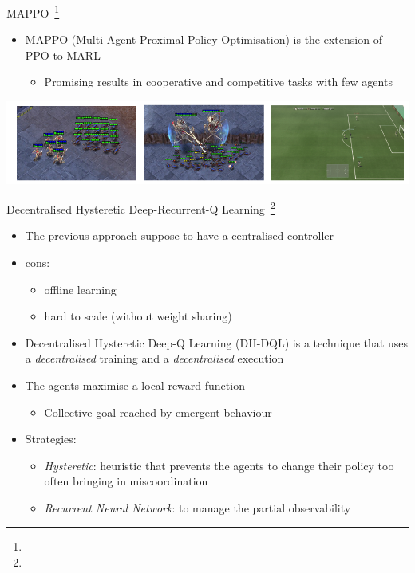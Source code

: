 \documentclass[presentation, 8pt]{beamer}\mode<presentation>{\usetheme{AMSBolognaFC}}
\begin{document}
\begin{frame}{MAPPO~\footnote[frame]{}}
	\begin{itemize}
		\item MAPPO (Multi-Agent Proximal Policy Optimisation) is the extension of PPO to MARL
		\begin{itemize}
			\item Promising results in cooperative and competitive tasks with few agents
		\end{itemize}
	\end{itemize}
	\centering
	\includegraphics[width=\textwidth]{img/mappo.png}
\end{frame}
\begin{frame}{Decentralised Hysteretic Deep-Recurrent-Q Learning~\footnote[frame]{}}
	\begin{itemize}
		\item The previous approach suppose to have a centralised controller
		\item cons:
		\begin{itemize}
			\item offline learning
			\item hard to scale (without weight sharing)
		\end{itemize}
		\item Decentralised Hysteretic Deep-Q Learning (DH-DQL) is a technique that uses a \emph{decentralised} training and a \emph{decentralised} execution
		\item The agents maximise a local reward function
		\begin{itemize}
			\item Collective goal reached by emergent behaviour
		\end{itemize}
		\item Strategies:
		\begin{itemize}
			\item \emph{Hysteretic}: heuristic that prevents the agents to change their policy too often bringing in miscoordination
			\item \emph{Recurrent Neural Network}: to manage the partial observability
		\end{itemize}
	\end{itemize}
\end{frame}
\end{document}
